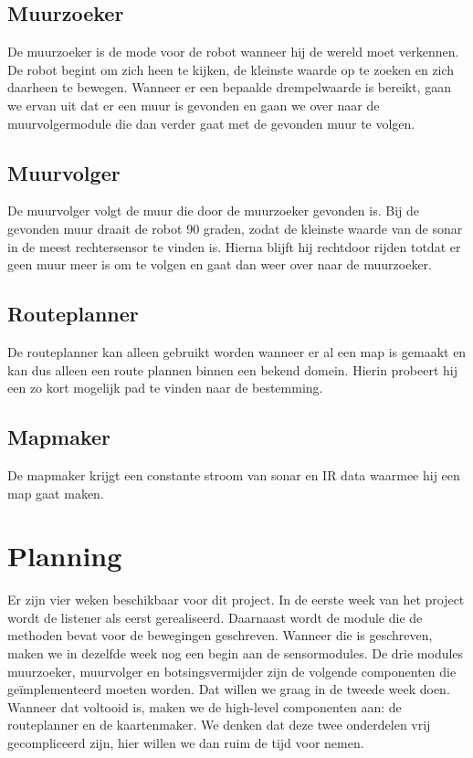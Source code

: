 \documentclass[a4paper,10pt]{article}
\begin{document}
\subsection{Muurzoeker}
De muurzoeker is de mode voor de robot wanneer hij de wereld moet verkennen. De robot begint om zich heen te kijken, de kleinste waarde op te zoeken en zich daarheen te bewegen. Wanneer er een bepaalde drempelwaarde is bereikt, gaan we ervan uit dat er een muur is gevonden en gaan we over naar de muurvolgermodule die dan verder gaat met de gevonden muur te volgen.
\subsection{Muurvolger}
De muurvolger volgt de muur die door de muurzoeker gevonden is. Bij de gevonden muur draait de robot 90 graden, zodat de kleinste waarde van de sonar in de meest rechtersensor te vinden is. Hierna blijft hij rechtdoor rijden totdat er geen muur meer is om te volgen en gaat dan weer over naar de muurzoeker.
\subsection{Routeplanner}
De routeplanner kan alleen gebruikt worden wanneer er al een map is gemaakt en kan dus alleen een route plannen binnen een bekend domein. Hierin probeert hij een zo kort mogelijk pad te vinden naar de bestemming. 
\subsection{Mapmaker}
De mapmaker krijgt een constante stroom van sonar en IR data waarmee hij een map gaat maken.
\section{Planning}
Er zijn vier weken beschikbaar voor dit project. In de eerste week van het project wordt de listener als eerst gerealiseerd. Daarnaast wordt de module die de methoden bevat voor de bewegingen geschreven. Wanneer die is geschreven, maken we in dezelfde week nog een begin aan de sensormodules. De drie modules muurzoeker, muurvolger en botsingsvermijder zijn de volgende componenten die ge\"{i}mplementeerd moeten worden. Dat willen we graag in de tweede week doen. Wanneer dat voltooid is, maken we de high-level componenten aan: de routeplanner en de kaartenmaker. We denken dat deze twee onderdelen vrij gecompliceerd zijn, hier willen we dan ruim de tijd voor nemen.\\
\end{document}

